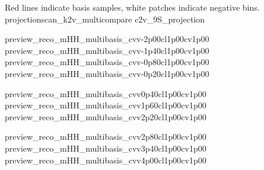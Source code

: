 

{Red lines indicate basis samples, white patches indicate negative bins.}
{projectionscan_k2v_multicompare}
{c2v_9S_projection}


{preview_reco_mHH_multibasis_cvv-2p00cl1p00cv1p00}
{preview_reco_mHH_multibasis_cvv-1p40cl1p00cv1p00}
{preview_reco_mHH_multibasis_cvv-0p80cl1p00cv1p00}
{preview_reco_mHH_multibasis_cvv-0p20cl1p00cv1p00}

{preview_reco_mHH_multibasis_cvv0p40cl1p00cv1p00}
{preview_reco_mHH_multibasis_cvv1p60cl1p00cv1p00}
{preview_reco_mHH_multibasis_cvv2p20cl1p00cv1p00}

{preview_reco_mHH_multibasis_cvv2p80cl1p00cv1p00}
{preview_reco_mHH_multibasis_cvv3p40cl1p00cv1p00}
{preview_reco_mHH_multibasis_cvv4p00cl1p00cv1p00}
